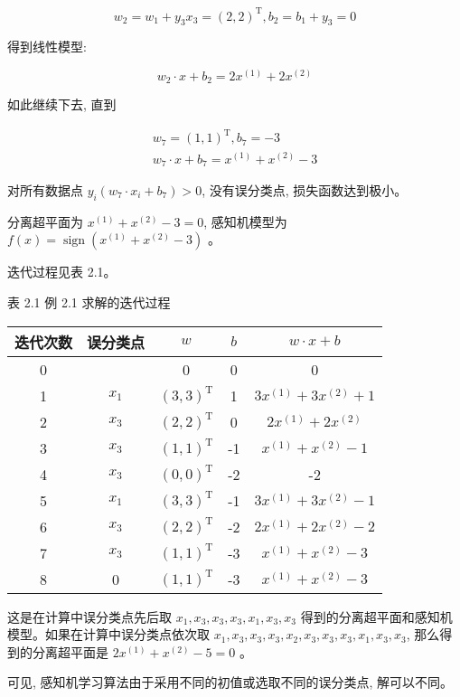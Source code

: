 \documentclass[10pt]{article}
\begin{document}
$$
w_{2}=w_{1}+y_{3} x_{3}=(2,2)^{\mathrm{T}}, b_{2}=b_{1}+y_{3}=0
$$

得到线性模型:

$$
w_{2} \cdot x+b_{2}=2 x^{(1)}+2 x^{(2)}
$$

如此继续下去, 直到

$$
\begin{gathered}
w_{7}=(1,1)^{\mathrm{T}}, b_{7}=-3 \\
w_{7} \cdot x+b_{7}=x^{(1)}+x^{(2)}-3
\end{gathered}
$$

对所有数据点 $y_{i}\left(w_{7} \cdot x_{i}+b_{7}\right)>0$, 没有误分类点, 损失函数达到极小。

分离超平面为 $x^{(1)}+x^{(2)}-3=0$, 感知机模型为 $f(x)=\operatorname{sign}\left(x^{(1)}+x^{(2)}-3\right)$ 。

迭代过程见表 2.1。

表 2.1 例 2.1 求解的迭代过程

\begin{center}
\begin{tabular}{ccccc}
\hline
迭代次数 & 误分类点 & $w$ & $b$ & $w \cdot x+b$ \\
\hline
0 &  & 0 & 0 & 0 \\
1 & $x_{1}$ & $(3,3)^{\mathrm{T}}$ & 1 & $3 x^{(1)}+3 x^{(2)}+1$ \\
2 & $x_{3}$ & $(2,2)^{\mathrm{T}}$ & 0 & $2 x^{(1)}+2 x^{(2)}$ \\
3 & $x_{3}$ & $(1,1)^{\mathrm{T}}$ & -1 & $x^{(1)}+x^{(2)}-1$ \\
4 & $x_{3}$ & $(0,0)^{\mathrm{T}}$ & -2 & -2 \\
5 & $x_{1}$ & $(3,3)^{\mathrm{T}}$ & -1 & $3 x^{(1)}+3 x^{(2)}-1$ \\
6 & $x_{3}$ & $(2,2)^{\mathrm{T}}$ & -2 & $2 x^{(1)}+2 x^{(2)}-2$ \\
7 & $x_{3}$ & $(1,1)^{\mathrm{T}}$ & -3 & $x^{(1)}+x^{(2)}-3$ \\
8 & 0 & $(1,1)^{\mathrm{T}}$ & -3 & $x^{(1)}+x^{(2)}-3$ \\
\hline
\end{tabular}
\end{center}

这是在计算中误分类点先后取 $x_{1}, x_{3}, x_{3}, x_{3}, x_{1}, x_{3}, x_{3}$ 得到的分离超平面和感知机模型。如果在计算中误分类点依次取 $x_{1}, x_{3}, x_{3}, x_{3}, x_{2}, x_{3}, x_{3}, x_{3}, x_{1}, x_{3}, x_{3}$, 那么得到的分离超平面是 $2 x^{(1)}+x^{(2)}-5=0$ 。

可见, 感知机学习算法由于采用不同的初值或选取不同的误分类点, 解可以不同。
\end{document}
